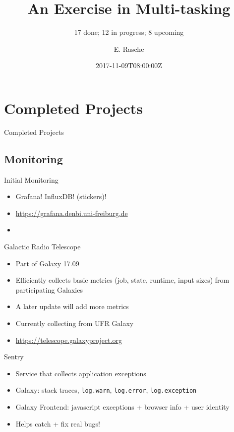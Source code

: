 \documentclass[12pt]{ufrslides}
\title[Projects]{An Exercise in Multi-tasking}
\subtitle{17 done; 12 in progress; 8 upcoming}
\author[ER]{E. Rasche}
\date{2017-11-09T08:00:00Z}
\begin{document}
\frame{\titlepage}

\section[Completed]{Completed Projects}
\begin{frame}{Completed Projects}
\end{frame}

\subsection{Monitoring}
	\begin{frame}{Initial Monitoring}
		\begin{itemize}
			\item Grafana! InfluxDB! (stickers)!
			\item \url{https://grafana.denbi.uni-freiburg.de}
			\item %
		\end{itemize}
	\end{frame}

	\begin{frame}{Galactic Radio Telescope}
		\begin{itemize}
			\item Part of Galaxy 17.09
			\item Efficiently collects basic metrics (job, state, runtime, input sizes) from participating Galaxies
			\item A later update will add more metrics
			\item Currently collecting from UFR Galaxy
			\item \url{https://telescope.galaxyproject.org}
		\end{itemize}
	\end{frame}

	\begin{frame}{Sentry}
		\begin{itemize}
			\item Service that collects application exceptions
			\item Galaxy: stack traces, \texttt{log.warn}, \texttt{log.error}, \texttt{log.exception}
			\item Galaxy Frontend: javascript exceptions + browser info + user identity
			\item Helps catch + fix real bugs!
		\end{itemize}
	\end{frame}
\end{document}
